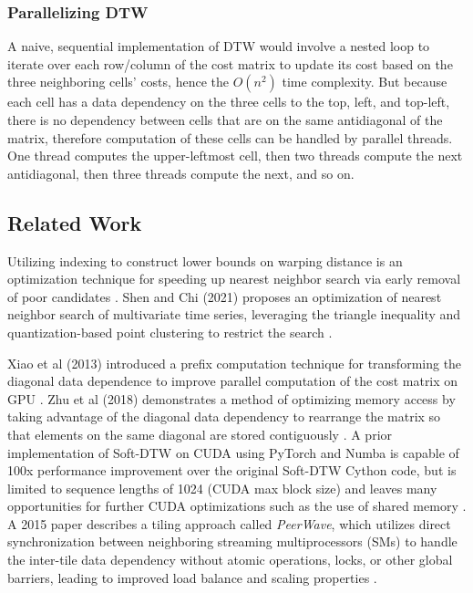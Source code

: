 \documentclass[12pt, letterpaper]{article}
\begin{document}
\subsubsection{Parallelizing DTW}

A naive, sequential implementation of DTW would involve a nested loop to iterate
over each row/column of the cost matrix to update its cost based on the three
neighboring cells' costs, hence the $O(n^2)$ time complexity. But because each
cell has a data dependency on the three cells to the top, left, and top-left,
there is no dependency between cells that are on the same antidiagonal of
the matrix, therefore computation of these cells can be handled by parallel
threads. One thread computes the upper-leftmost cell, then two threads compute
the next antidiagonal, then three threads compute the next, and so on.

\subsection{Related Work}

Utilizing indexing to construct lower bounds on warping distance is an
optimization technique for speeding up nearest neighbor search via early removal
of poor candidates \cite{keogh_exact_2002}. Shen and Chi (2021) proposes an
optimization of nearest neighbor search of multivariate time series, leveraging
the triangle inequality and quantization-based point clustering to restrict the
search \cite{shen_tc-dtw_2021}.

Xiao et al (2013) introduced a prefix computation technique for transforming the
diagonal data dependence to improve parallel computation of the cost matrix on
GPU \cite{xiao_parallelizing_2013}. Zhu et al (2018) demonstrates a method of
optimizing  memory access by taking advantage of the diagonal data dependency to
rearrange the matrix so that elements on the same diagonal are stored
contiguously \cite{zhu_developing_2018}. A prior implementation of Soft-DTW on
CUDA using PyTorch and Numba is capable of 100x performance improvement over the
original Soft-DTW Cython code, but is limited to sequence lengths of 1024 (CUDA
max block size) and leaves many opportunities for further CUDA optimizations
such as the use of shared memory \cite{maghoumi_pytorch-softdtw-cuda_2021}. A
2015 paper describes a tiling approach called \emph{PeerWave}, which utilizes
direct synchronization between neighboring streaming multiprocessors (SMs) to
handle the inter-tile data dependency without atomic operations, locks, or other
global barriers, leading to improved load balance and scaling properties
\cite{belviranli_peerwave_2015}.
\end{document}
